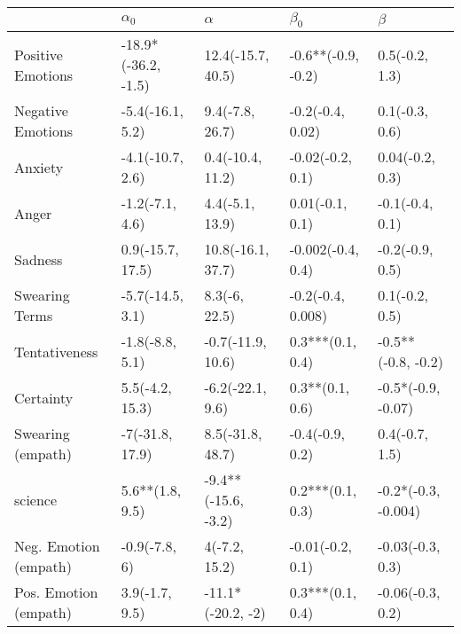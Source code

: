 \begin{tabular}{lllll}
\toprule
{} &           $\alpha_0$ &             $\alpha$ &           $\beta_0$ &              $\beta$ \\
\midrule
Positive Emotions     &  -18.9*(-36.2, -1.5) &    12.4(-15.7, 40.5) &  -0.6**(-0.9, -0.2) &       0.5(-0.2, 1.3) \\
Negative Emotions     &     -5.4(-16.1, 5.2) &      9.4(-7.8, 26.7) &    -0.2(-0.4, 0.02) &       0.1(-0.3, 0.6) \\
Anxiety               &     -4.1(-10.7, 2.6) &     0.4(-10.4, 11.2) &    -0.02(-0.2, 0.1) &      0.04(-0.2, 0.3) \\
Anger                 &      -1.2(-7.1, 4.6) &      4.4(-5.1, 13.9) &     0.01(-0.1, 0.1) &      -0.1(-0.4, 0.1) \\
Sadness               &     0.9(-15.7, 17.5) &    10.8(-16.1, 37.7) &   -0.002(-0.4, 0.4) &      -0.2(-0.9, 0.5) \\
Swearing Terms        &     -5.7(-14.5, 3.1) &        8.3(-6, 22.5) &   -0.2(-0.4, 0.008) &       0.1(-0.2, 0.5) \\
Tentativeness         &      -1.8(-8.8, 5.1) &    -0.7(-11.9, 10.6) &    0.3***(0.1, 0.4) &   -0.5**(-0.8, -0.2) \\
Certainty             &      5.5(-4.2, 15.3) &     -6.2(-22.1, 9.6) &     0.3**(0.1, 0.6) &   -0.5*(-0.9, -0.07) \\
Swearing (empath)     &      -7(-31.8, 17.9) &     8.5(-31.8, 48.7) &     -0.4(-0.9, 0.2) &       0.4(-0.7, 1.5) \\
science               &      5.6**(1.8, 9.5) &  -9.4**(-15.6, -3.2) &    0.2***(0.1, 0.3) &  -0.2*(-0.3, -0.004) \\
Neg. Emotion (empath) &        -0.9(-7.8, 6) &        4(-7.2, 15.2) &    -0.01(-0.2, 0.1) &     -0.03(-0.3, 0.3) \\
Pos. Emotion (empath) &       3.9(-1.7, 9.5) &    -11.1*(-20.2, -2) &    0.3***(0.1, 0.4) &     -0.06(-0.3, 0.2) \\
\bottomrule
\end{tabular}
